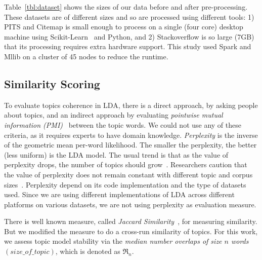 \documentclass[twocolumn,5p,sort&compress]{elsarticle}
\theoremstyle{break}
\begin{document}
  Table~\ref{tbl:dataset} shows the sizes of our data before and after pre-processing.
  These datasets are of different sizes and so are processed using different tools: 1) PITS and Citemap is small enough to process on a single (four core) desktop machine
  using Scikit-Learn~\cite{pedregosa2011scikit} and Python, and 2) Stackoverflow is so large (7GB) that its  processing requires extra hardware support.
 This study used Spark and Mllib on a cluster of 45 nodes to
 reduce the runtime.
  




\subsection{Similarity Scoring}

To evaluate topics coherence in LDA, there is a direct approach, by asking people about topics, and an indirect approach by evaluating \textit{pointwise mutual information (PMI)}~\cite{lau2014machine, o2015analysis} between the topic words. We could not use any of these criteria, as it requires experts to have domain knowledge. \textit{Perplexity} is  the inverse of the geometric mean per-word likelihood. The smaller the perplexity, the better (less uniform) is the LDA model. The usual trend is that as the value of perplexity drops, the number of topics should grow~\cite{koltcov2014latent}. Researchers caution that the value of perplexity does not remain constant with different topic and corpus sizes~\cite{ zhao2015heuristic}. Perplexity depend on its code implementation and the type of datasets used. Since we are using different implementations of LDA across different platforms on various datasets, we are not using perplexity as evaluation measure.

There is well known measure, called \textit{Jaccard Similarity}~\cite{o2015analysis, galvis2013analysis}, for measuring similarity. But we modified the measure to do a cross-run similarity of topics. For this work, we assess topic model stability via the {\em median number overlaps of size $n$ words $\mathit{(size\_of\_topic)}$}, which is denoted as $\Re_n$.
 
\end{document}

